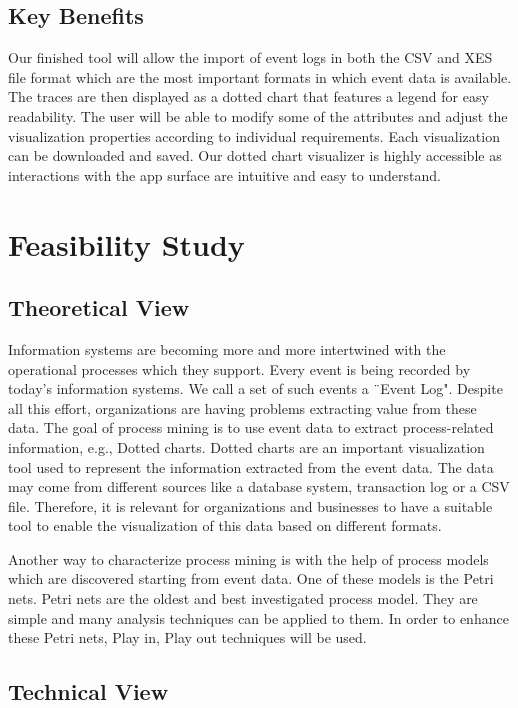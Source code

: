 \documentclass[a4paper,11pt]{scrartcl}
\begin{document}
\subsection*{Key Benefits}
Our finished tool will allow the import of event logs in both the CSV and XES file format which are the most important formats in which event data is available. 
The traces are then displayed as a dotted chart that features a legend for easy readability. The user will be able to modify some of the attributes and adjust the visualization properties according to individual requirements. Each visualization can be downloaded and saved. 
Our dotted chart visualizer is highly accessible as interactions with the app surface are intuitive and easy to understand.

\section*{Feasibility Study}
\subsection*{Theoretical View}
Information systems are becoming more and more intertwined with the operational processes which they support. 
Every event is being recorded by today's information systems. We call a set of such events a ¨Event Log". 
Despite all this effort, organizations are having problems extracting value from these data. 
The goal of process mining is to use event data to extract process-related information, e.g., Dotted charts.
Dotted charts are  an important visualization tool used to represent the information extracted from the event data.
The data may come from different sources like a database system, transaction log or a CSV file. Therefore, it is relevant for 
organizations and businesses to have a suitable tool to enable the visualization of this data based on different formats.

Another way to characterize process mining is with the help of process models which are discovered starting from event data.
One of these models is the Petri nets. Petri nets are the oldest and best investigated process model. They are simple and
many analysis techniques can be applied to them.
In order to enhance these Petri nets, Play in, Play out techniques will be used.

\subsection*{Technical View}
\end{document}
